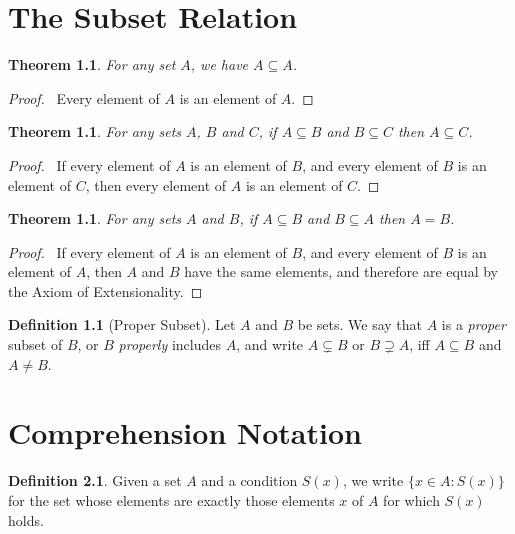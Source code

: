 \documentclass{report}
\let\qed\relax
\newtheorem{thm}[ax]{Theorem}
\theoremstyle{definition}
\newtheorem{df}[ax]{Definition}
\begin{document}
\chapter{The Subset Relation}

\begin{thm}
For any set $A$, we have $A \subseteq A$.
\end{thm}

\begin{proof}
\pf\ Every element of $A$ is an element of $A$. \qed
\end{proof}

\begin{thm}
For any sets $A$, $B$ and $C$, if $A \subseteq B$ and $B \subseteq C$ then $A \subseteq C$.
\end{thm}

\begin{proof}
\pf\ If every element of $A$ is an element of $B$, and every element of $B$ is an element of $C$, then every element of $A$ is an element of $C$. \qed
\end{proof}

\begin{thm}
For any sets $A$ and $B$, if $A \subseteq B$ and $B \subseteq A$ then $A = B$.
\end{thm}

\begin{proof}
\pf\ If every element of $A$ is an element of $B$, and every element of $B$ is an element of $A$, then $A$ and $B$ have the same elements, and therefore are equal by the Axiom of Extensionality. \qed
\end{proof}

\begin{df}[Proper Subset]
Let $A$ and $B$ be sets. We say that $A$ is a \emph{proper} subset of $B$, or $B$ \emph{properly} includes $A$, and write $A \subsetneq B$ or $B \supsetneq A$, iff $A \subseteq B$ and $A \neq B$.
\end{df}

\chapter{Comprehension Notation}

\begin{df}
Given a set $A$ and a condition $S(x)$, we write $\{ x \in A : S(x) \}$ for the set whose elements are exactly those elements $x$ of $A$ for which $S(x)$ holds.
\end{df}
\end{document}
